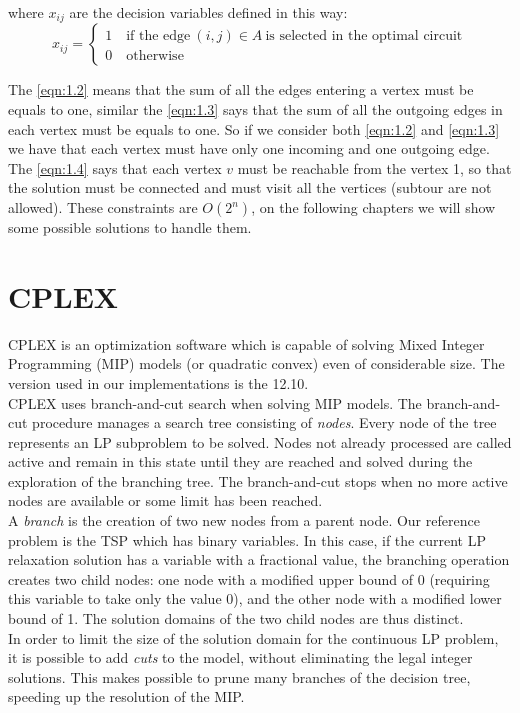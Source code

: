 where $x_{ij}$ are the decision variables defined in this way:
\[ x_{ij} =
	\begin{cases}
		1 \quad \text{if the edge} \ (i,j) \in A \ \text{is selected in the optimal circuit} \\
		0 \quad \text{otherwise}
	\end{cases}
\]

\noindent The \ref{eqn:1.2} means that the sum of all the edges entering a vertex must be equals to one, similar the \ref{eqn:1.3} says that the sum of all the outgoing edges in each vertex must be equals to one. So if we consider both \ref{eqn:1.2} and \ref{eqn:1.3} we have that each vertex must have only one incoming and one outgoing edge. \\ The \ref{eqn:1.4} says that each vertex $v$ must be reachable from the vertex 1, so that the solution must be connected and must visit all the vertices (subtour are not allowed). These constraints are $O(2^n)$, on the following chapters we will show some possible solutions to handle them.


\section{CPLEX}
CPLEX is an optimization software which is capable of solving Mixed Integer Programming (MIP) models (or quadratic convex) even of considerable size. The version used in our implementations is the 12.10.\\
CPLEX uses branch-and-cut search when solving MIP models. The branch-and-cut procedure manages a search tree consisting of \textit{nodes}. Every node of the tree represents an LP subproblem to be solved. Nodes not already processed are called active and remain in this state until they are reached and solved during the exploration of the branching tree. The branch-and-cut stops when no more active nodes are available or some limit has been reached.\\
A \textit{branch} is the creation of two new nodes from a parent node. Our reference problem is the TSP which has binary variables. In this case, if the current LP relaxation solution has a variable with a fractional value, the branching operation creates two child nodes: one node with a modified upper bound of 0 (requiring this variable to take only the value 0), and the other node with a modified lower bound of 1. The solution domains of the two child nodes are thus distinct.\\
In order to limit the size of the solution domain for the continuous LP problem, it is possible to add \textit{cuts} to the model, without eliminating the legal integer solutions. This makes possible to prune many branches of the decision tree, speeding up the resolution of the MIP.

